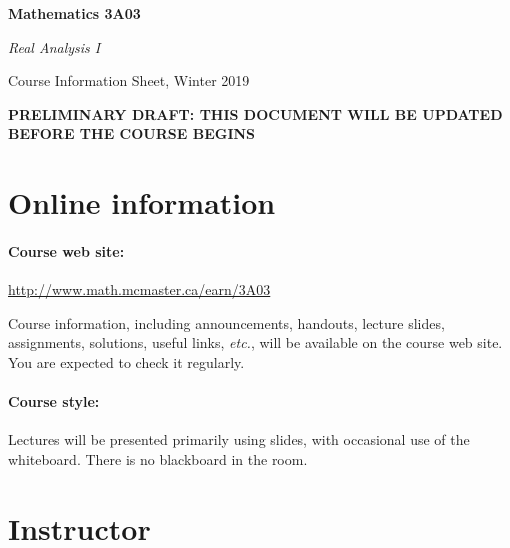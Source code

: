 \documentclass[12pt]{article}
\begin{document}

\vspace{-2cm}

{\Large\parindent=0pt

{\bfseries Mathematics 3A03

{\slshape Real Analysis I}

Course Information Sheet, Winter 2019

{\color{red}\bfseries PRELIMINARY DRAFT: THIS DOCUMENT WILL BE UPDATED BEFORE THE COURSE BEGINS}

}}

\bigskip

\noindent

\section*{Online information}

\paragraph*{Course web site:} \url{http://www.math.mcmaster.ca/earn/3A03}

\noindent
Course information, including announcements, handouts, lecture slides,
assignments, solutions, useful links, {\it etc.\/}, will be available
on the course web site.  You are expected to check it regularly.

\paragraph*{Course style:}
Lectures will be presented primarily using slides, with occasional use
of the whiteboard.  There is no blackboard in the room.

\section*{Instructor}
\end{document}
